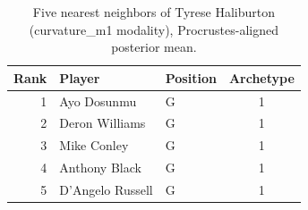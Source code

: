 \begin{table}[htbp]
  \centering\small
  \begin{tabular}{rllc}
    \toprule
    Rank & Player & Position & Archetype \\
    \midrule
    1 & Ayo Dosunmu & G & 1 \\
    2 & Deron Williams & G & 1 \\
    3 & Mike Conley & G & 1 \\
    4 & Anthony Black & G & 1 \\
    5 & D'Angelo Russell & G & 1 \\
    \bottomrule
  \end{tabular}
  \caption{Five nearest neighbors of Tyrese Haliburton (curvature_m1 modality), Procrustes-aligned posterior mean.}
  \label{tab:Tyrese_Haliburton_neighbors_curvature_m1}
\end{table}

